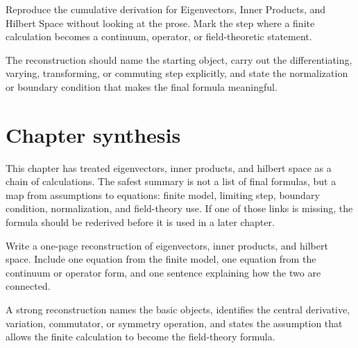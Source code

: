 \begin{exercise}
Reproduce the cumulative derivation for Eigenvectors, Inner Products, and Hilbert Space without looking at the prose.  Mark the step where a finite calculation becomes a continuum, operator, or field-theoretic statement.
\begin{answer}
The reconstruction should name the starting object, carry out the differentiating, varying, transforming, or commuting step explicitly, and state the normalization or boundary condition that makes the final formula meaningful.
\end{answer}
\end{exercise}



\section{Chapter synthesis}

This chapter has treated eigenvectors, inner products, and hilbert space as a chain of calculations.  The safest summary is not a list of final formulas, but a map from assumptions to equations: finite model, limiting step, boundary condition, normalization, and field-theory use.  If one of those links is missing, the formula should be rederived before it is used in a later chapter.

\begin{exercise}
Write a one-page reconstruction of eigenvectors, inner products, and hilbert space.  Include one equation from the finite model, one equation from the continuum or operator form, and one sentence explaining how the two are connected.
\begin{answer}
A strong reconstruction names the basic objects, identifies the central derivative, variation, commutator, or symmetry operation, and states the assumption that allows the finite calculation to become the field-theory formula.
\end{answer}
\end{exercise}
